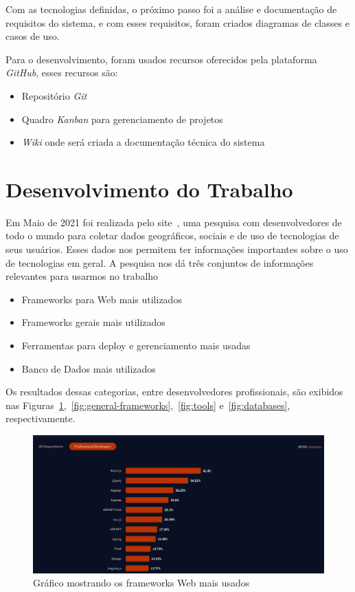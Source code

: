 \documentclass[12pt]{article}
\begin{document}
Com as tecnologias definidas, o próximo passo foi a análise e documentação de requisitos do sistema,
e com esses requisitos, foram criados diagramas de classes e casos de uso.

Para o desenvolvimento, foram usados recursos oferecidos pela plataforma \textit{GitHub}, esses recursos são:

\begin{itemize}
  \item Repositório \textit{Git}
  \item Quadro \textit{Kanban} para gerenciamento de projetos
  \item \textit{Wiki} onde será criada a documentação técnica do sistema
\end{itemize}

\section{Desenvolvimento do Trabalho}\label{Desenvolvimento}

Em Maio de 2021 foi realizada pelo site~\cite{stack11}, uma pesquisa com desenvolvedores de todo o mundo para
coletar dados geográficos, sociais e de uso de tecnologias de seus usuários. Esses dados nos permitem ter
informações importantes sobre o uso de tecnologias em geral. A pesquisa nos dá três conjuntos
de informações relevantes para usarmos no trabalho

\begin{itemize}
  \item Frameworks para Web mais utilizados
  \item Frameworks gerais mais utilizados
  \item Ferramentas para deploy e gerenciamento mais usadas
  \item Banco de Dados mais utilizados
\end{itemize}

Os resultados dessas categorias, entre desenvolvedores profissionais, são exibidos nas
Figuras~\ref{fig:web-frameworks},~\ref{fig:general-frameworks},~\ref{fig:tools} e~\ref{fig:databases}, respectivamente.

\begin{figure}[H]
  \centering
  \includegraphics[width=1\textwidth]{stackoverflow/web_frameworks_usage.png}
  \caption{Gráfico mostrando os frameworks Web mais usados}\label{fig:web-frameworks}
\end{figure}
\end{document}
